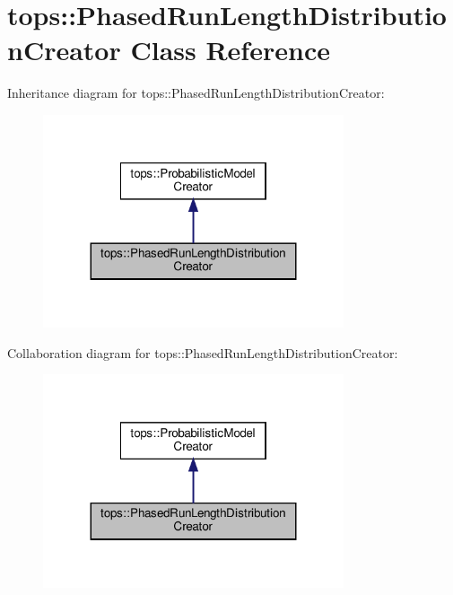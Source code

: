 \hypertarget{classtops_1_1PhasedRunLengthDistributionCreator}{}\section{tops\+:\+:Phased\+Run\+Length\+Distribution\+Creator Class Reference}
\label{classtops_1_1PhasedRunLengthDistributionCreator}


Inheritance diagram for tops\+:\+:Phased\+Run\+Length\+Distribution\+Creator\+:
\nopagebreak
\begin{figure}[H]
\begin{center}
\leavevmode
\includegraphics[width=251pt]{classtops_1_1PhasedRunLengthDistributionCreator__inherit__graph}
\end{center}
\end{figure}


Collaboration diagram for tops\+:\+:Phased\+Run\+Length\+Distribution\+Creator\+:
\nopagebreak
\begin{figure}[H]
\begin{center}
\leavevmode
\includegraphics[width=251pt]{classtops_1_1PhasedRunLengthDistributionCreator__coll__graph}
\end{center}
\end{figure}
